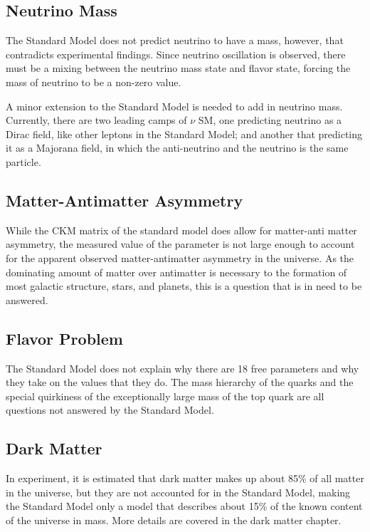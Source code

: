 \subsection{Neutrino Mass}
The Standard Model does not predict neutrino to have a mass, however, that contradicts experimental findings. Since neutrino oscillation is observed, there must be a mixing between the neutrino mass state and flavor state, forcing the mass of neutrino to be a non-zero value. 

A minor extension to the Standard Model is needed to add in neutrino mass. Currently, there are two leading camps of $\nu$ SM, one predicting neutrino as a Dirac field, like other leptons in the Standard Model; and another that predicting it as a Majorana field, in which the anti-neutrino and the neutrino is the same particle. 



\subsection{Matter-Antimatter Asymmetry}
While the CKM matrix of the standard model does allow for matter-anti matter asymmetry, the measured value of the parameter is not large enough to account for the apparent observed matter-antimatter asymmetry in the universe. As the dominating amount of matter over antimatter is necessary to the formation of most galactic structure, stars, and planets, this is a question that is in need to be answered.

\subsection{Flavor Problem}
The Standard Model does not explain why there are 18 free parameters and why they take on the values that they do. The mass hierarchy of the quarks and the special quirkiness of the exceptionally large mass of the top quark are all questions not answered by the Standard Model. 


\subsection{Dark Matter}
In experiment, it is estimated that dark matter makes up about 85\% of all matter in the universe, but they are not accounted for in the Standard Model, making the Standard Model only a model that describes about 15\% of the known content of the universe in mass. More details are covered in the dark matter chapter. 


